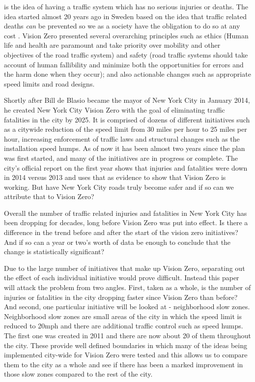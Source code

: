 \documentclass[10pt,journal,compsoc]{IEEEtran}
\begin{document}

 is the idea of having a traffic system which has no serious injuries or deaths.  The idea started almost 20 years ago in Sweden based on the idea that traffic related deaths \textit{can} be prevented so we as a society have the obligation to do so at any cost \cite{tingvall2000vision}.  Vision Zero presented several overarching principles such as ethics (Human life and health are paramount and take priority over mobility and other objectives of the road traffic system) and safety (road traffic systems should take account of human fallibility and minimize both the opportunities for errors and the harm done when they occur); and also actionable changes such as appropriate speed limits and road designs.

Shortly after Bill de Blasio became the mayor of New York City in January 2014, he created New York City Vision Zero with the goal of eliminating traffic fatalities in the city by 2025.  It is comprised of dozens of different initiatives such as a citywide reduction of the speed limit from 30 miles per hour to 25 miles per hour, increasing enforcement of traffic laws and structural changes such as the installation speed humps.  As of now it has been almost two years since the plan was first started, and many of the initiatives are in progress or complete.  The city's official report on the first year shows that injuries and fatalities were down in 2014 versus 2013 and uses that as evidence to show that Vision Zero is working\cite{vzreport}.  But have New York City roads truly become safer and if so can we attribute that to Vision Zero?

Overall the number of traffic related injuries and fatalities in New York City has been dropping for decades, long before Vision Zero was put into effect.  Is there a difference in the trend before and after the start of the vision zero initiatives?  And if so can a year or two's worth of data be enough to conclude that the change is statistically significant?

Due to the large number of initiatives that make up Vision Zero, separating out the effect of each individual initiative would prove difficult.  Instead this paper will attack the problem from two angles.  First, taken as a whole, is the number of injuries or fatalities in the city dropping faster since Vision Zero than before?  And second, one particular initiative will be looked at - neighborhood slow zones.  Neighborhood slow zones are small areas of the city in which the speed limit is reduced to 20mph and there are additional traffic control such as speed humps.  The first one was created in 2011 and there are now about 20 of them throughout the city.  These provide well defined boundaries in which many of the ideas being implemented city-wide for Vision Zero were tested and this allows us to compare them to the city as a whole and see if there has been a marked improvement in those slow zones compared to the rest of the city.
\end{document}
